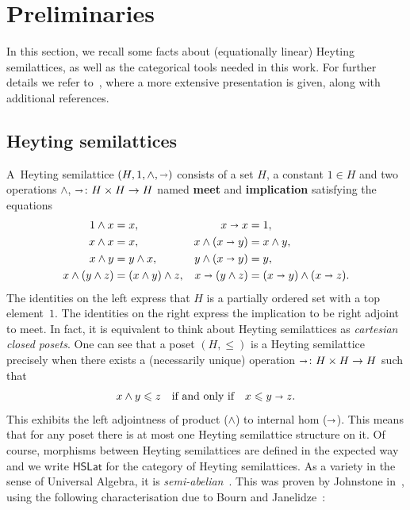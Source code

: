 \documentclass[reqno,a4paper]{amsart}
\theoremstyle{remark}
\theoremstyle{definition}
\newcommand{\defn}{\textbf}
\newcommand{\iimplies}{\shortrightarrow}
\newcommand{\HSLat}{\ensuremath{\mathsf{HSLat}}}
\renewcommand{\leq}{\leqslant}
\begin{document}
\section{Preliminaries}\label{section preliminaries}

In this section, we recall some facts about (equationally linear) Heyting semilattices, as well as the categorical tools needed in this work. For further details we refer to~\cite{HSLat}, where a more extensive presentation is given, along with additional references.

\subsection*{Heyting semilattices}

A~Heyting semilattice \((H,1,\wedge ,\iimplies)\) consists of a set \(H\), a constant \(1\in H\) and two operations \(\wedge\), \(\iimplies \colon H \times H \rightarrow H\) named \defn{meet} and \defn{implication} satisfying the equations
\begin{align*}
	1\wedge x           & = x,                    & x\iimplies x             & =1,                                     \\
	x\wedge x           & =x,                     & x\wedge ( x \iimplies y) & = x \wedge y,                           \\
	x\wedge y           & =y\wedge x,             & y \wedge (x \iimplies y) & =y,                                     \\
	x\wedge (y\wedge z) & = (x \wedge y)\wedge z, & x \iimplies (y \wedge z) & = (x\iimplies y) \wedge (x\iimplies z).
\end{align*}
The identities on the left express that \(H\) is a partially ordered set with a top element~\(1\). The identities on the right express the implication to be right adjoint to meet. In fact, it is equivalent to think about Heyting semilattices as \emph{cartesian closed posets}. One can see that a poset \((H,\leq)\) is a Heyting semilattice precisely when there exists a (necessarily unique) operation \(\iimplies \colon H \times H \rightarrow H\) such that
\begin{align*}
	x \wedge y \leq z \quad \text{if and only if} \quad x \leq y\iimplies z.
\end{align*}
This exhibits the left adjointness of product (\(\wedge\)) to internal hom (\(\iimplies\)). This means that for any poset there is at most one Heyting semilattice structure on it. Of course, morphisms between Heyting semilattices are defined in the expected way and we write \(\HSLat\) for the category of Heyting semilattices. As a variety in the sense of Universal Algebra, it is \emph{semi-abelian}~\cite{Janelidze-Marki-Tholen}. This was proven by Johnstone in~\cite{Johnstone:Heyting}, using the following characterisation due to Bourn and Jan\-elidze~\cite{Bourn-Janelidze}:
\end{document}
